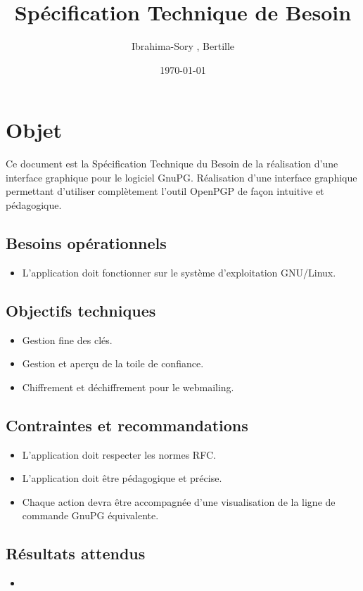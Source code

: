 \documentclass{../res/univ-projet}
\title{Spécification Technique de Besoin}
\author{Ibrahima-Sory \bsc{Barry}, Bertille \bsc{Bouillie}}
\date{\today}
\begin{document}
\maketitle
\newpage
\tableofcontents
\newpage

\section{Objet}

Ce document est la Spécification Technique du Besoin de la réalisation d'une interface graphique pour le logiciel GnuPG.
Réalisation d'une interface graphique permettant d'utiliser complètement l'outil OpenPGP
de façon intuitive et pédagogique.

\subsection{Besoins opérationnels}
\begin{itemize}
 \item L'application doit fonctionner sur le système d'exploitation GNU/Linux.
\end{itemize}

\subsection{Objectifs techniques}
\begin{itemize}
 \item Gestion fine des clés.
 \item Gestion et aperçu de la toile de confiance.
 \item Chiffrement et déchiffrement pour le webmailing.
\end{itemize}

\subsection{Contraintes et recommandations}
\begin{itemize}
 \item L'application doit respecter les normes RFC.
 \item L'application doit être pédagogique et précise.
 \item Chaque action devra être accompagnée d'une visualisation de la ligne de commande GnuPG équivalente.
\end{itemize}

\subsection{Résultats attendus}
\begin{itemize}
 \item 
\end{itemize}
\end{document}
